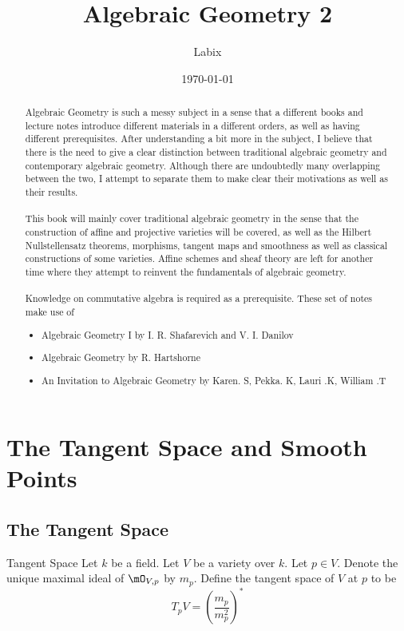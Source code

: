 \documentclass[a4paper]{article}
\title{Algebraic Geometry 2}
\author{Labix}
\date{\today}
\begin{document}
\maketitle
\begin{abstract}
Algebraic Geometry is such a messy subject in a sense that a different books and lecture notes introduce different materials in a different orders, as well as having different prerequisites. After understanding a bit more in the subject, I believe that there is the need to give a clear distinction between traditional algebraic geometry and contemporary algebraic geometry. Although there are undoubtedly many overlapping between the two, I attempt to separate them to make clear their motivations as well as their results. \\~\\

This book will mainly cover traditional algebraic geometry in the sense that the construction of affine and projective varieties will be covered, as well as the Hilbert Nullstellensatz theorems, morphisms, tangent maps and smoothness as well as classical constructions of some varieties. Affine schemes and sheaf theory are left for another time where they attempt to reinvent the fundamentals of algebraic geometry. \\~\\

Knowledge on commutative algebra is required as a prerequisite. These set of notes make use of
\begin{itemize}
\item Algebraic Geometry I by I. R. Shafarevich and V. I. Danilov
\item Algebraic Geometry by R. Hartshorne
\item An Invitation to Algebraic Geometry by Karen. S, Pekka. K, Lauri .K, William .T
\end{itemize}
\end{abstract}
\pagebreak
\tableofcontents

\pagebreak
\section{The Tangent Space and Smooth Points}
\subsection{The Tangent Space}
\begin{defn}{Tangent Space}{} Let $k$ be a field. Let $V$ be a variety over $k$. Let $p\in V$. Denote the unique maximal ideal of $\mO_{V,p}$ by $m_p$. Define the tangent space of $V$ at $p$ to be $$T_pV=\left(\frac{m_p}{m_p^2}\right)^\ast$$
\end{defn}
\end{document}
